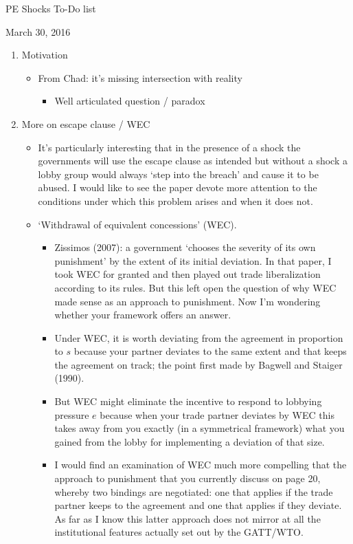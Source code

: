 \documentclass[12pt]{article}
\begin{document}
\begin{center}
PE Shocks To-Do list
\end{center}

March 30, 2016
\begin{enumerate}
	\item Motivation
		\begin{itemize}
			\item From Chad: it's missing intersection with reality
				\begin{itemize}
					\item Well articulated question / paradox
				\end{itemize}
		\end{itemize}
	\item More on escape clause / WEC
		\begin{itemize}
			\item It's particularly interesting that in the presence of a shock the governments will use the escape clause as intended but without a shock a lobby group would always `step into the breach' and cause it to be abused.  I would like to see the paper devote more attention to the conditions under which this problem arises and when it does not.
			\item `Withdrawal of equivalent concessions' (WEC).
				\begin{itemize}
					\item Zissimos (2007): a government `chooses the severity of its own punishment' by the extent of its initial deviation.  In that paper, I took WEC for granted and then played out trade liberalization according to its rules.  But this left open the question of why WEC made sense as an approach to punishment.  Now I'm wondering whether your framework offers an answer.
					\item Under WEC, it is worth deviating from the agreement in proportion to $s$ because your partner deviates to the same extent and that keeps the agreement on track; the point first made by Bagwell and Staiger (1990).
					\item But WEC might eliminate the incentive to respond to lobbying pressure $e$ because when your trade partner deviates by WEC this takes away from you exactly (in a symmetrical framework) what you gained from the lobby for implementing a deviation of that size.
					\item I would find an examination of WEC much more compelling that the approach to punishment that you currently discuss on page 20, whereby two bindings are negotiated: one that applies if the trade partner keeps to the agreement and one that applies if they deviate.  As far as I know this latter approach does not mirror at all the institutional features actually set out by the GATT/WTO.

\end{itemize}
\end{itemize}
\end{enumerate}
\end{document}
